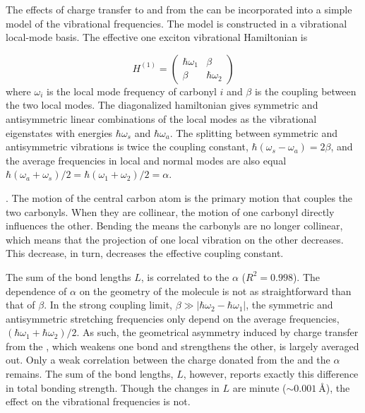 \documentclass[%
  class = book,%
  crop = false,%
  float = true,%
  multi = true,%
  preview = false,%
]{standalone}
\begin{document}
{The effects of charge transfer to and from the  can be incorporated into a simple model of the vibrational frequencies. The model is constructed in a vibrational local-mode basis. The effective one exciton vibrational Hamiltonian is

\begin{equation}
  H^{(1)} =
  \begin{pmatrix}
    \hbar\omega_1 & \beta\\
    \beta & \hbar\omega_2
  \end{pmatrix}
\end{equation}
where \(\omega_i\) is the local mode frequency of carbonyl \(i\) and \(\beta\) is the coupling between the two local modes. The diagonalized hamiltonian gives symmetric and antisymmetric linear combinations of the local modes  as the vibrational eigenstates with energies \(\hbar\omega_s\) and \(\hbar\omega_a\). The splitting between symmetric and antisymmetric vibrations is twice the coupling constant, \(\hbar(\omega_s - \omega_a) = 2\beta\), and the average frequencies in local and normal modes are also equal \(\hbar(\omega_a + \omega_s)/2 = \hbar(\omega_1 + \omega_2)/2 = \alpha\).

. The motion of the central carbon atom is the primary motion that couples the two carbonyls. When they are collinear, the motion of one carbonyl directly influences the other. Bending the  means the carbonyls are no longer collinear, which means that the projection of one local vibration on the other decreases. This decrease, in turn, decreases the effective coupling constant.

The sum of the  bond lengths \(L\), is correlated to the \(\alpha\) (\(R^2 = 0.998\)). The dependence of \(\alpha\) on the geometry of the molecule is not as straightforward than that of \(\beta\). In the strong coupling limit, \(\beta \gg |\hbar\omega_2-\hbar\omega_1|\), the symmetric and antisymmetric stretching frequencies only depend on the average frequencies, \((\hbar\omega_1 + \hbar\omega_2)/2\). As such, the geometrical asymmetry induced by charge transfer from the , which weakens one bond and strengthens the other, is largely averaged out. Only a weak correlation between the charge donated from the  and the \(\alpha\) remains. The sum of the bond lengths, \(L\), however, reports exactly this difference in total bonding strength. Though the changes in \(L\) are minute (\(\sim \SI{0.001}{\angstrom}\)), the effect on the vibrational frequencies is not.

}
\end{document}
